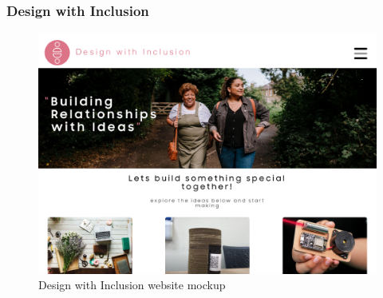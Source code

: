 \subsubsection{Design with Inclusion}
\label{FutureStudyTwo}
\begin{figure}[htp]
\centering
\includegraphics[width=1\linewidth]{Images/Discussion/Design_For_Inclusion.png}
\caption{Design with Inclusion website mockup}
\label{fig:DesignInclusion}
\end{figure}
